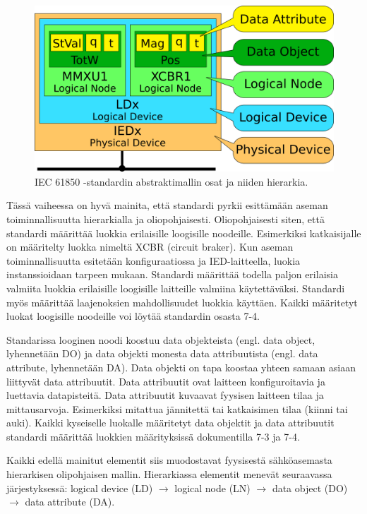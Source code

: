 \begin{figure}
	\includegraphics[width=1\textwidth]{pictures/iec61850-data-modeling.png}
	\caption{IEC 61850 -standardin abstraktimallin osat ja niiden hierarkia.}
	\label{fig:iec61850-data-modeling}
\end{figure}

Tässä vaiheessa on hyvä mainita, että standardi pyrkii esittämään aseman toiminnallisuutta hierarkialla ja oliopohjaisesti. Oliopohjaisesti siten, että  standardi määrittää luokkia erilaisille loogisille noodeille. Esimerkiksi katkaisijalle on määritelty luokka nimeltä XCBR (circuit braker). Kun aseman toiminnallisuutta esitetään konfiguraatiossa ja IED-laitteella, luokia instanssioidaan tarpeen mukaan. Standardi määrittää todella paljon erilaisia valmiita luokkia erilaisille loogisille laitteille valmiina käytettäväksi. Standardi myös määrittää laajenoksien mahdollisuudet luokkia käyttäen. Kaikki määritetyt luokat loogisille noodeille voi löytää standardin osasta 7-4. 

Standarissa looginen noodi koostuu data objekteista (engl. data object, lyhennetään DO) ja data objekti monesta data attribuutista (engl. data attribute, lyhennetään DA). Data objekti on tapa koostaa yhteen samaan asiaan liittyvät data attribuutit. Data attribuutit ovat laitteen konfiguroitavia ja luettavia datapisteitä. Data attribuutit kuvaavat fyysisen laitteen tilaa ja mittausarvoja. Esimerkiksi mitattua jännitettä tai katkaisimen tilaa (kiinni tai auki). Kaikki kyseiselle luokalle määritetyt data objektit ja data attribuutit standardi määrittää luokkien määrityksissä dokumentilla 7-3 ja 7-4.

Kaikki edellä mainitut elementit siis muodostavat fyysisestä sähköasemasta hierarkisen olipohjaisen mallin. Hierarkiassa elementit menevät seuraavassa järjestyksessä: logical device (LD) $\rightarrow$ logical node (LN) $\rightarrow$ data object (DO) $\rightarrow$ data attribute (DA).

